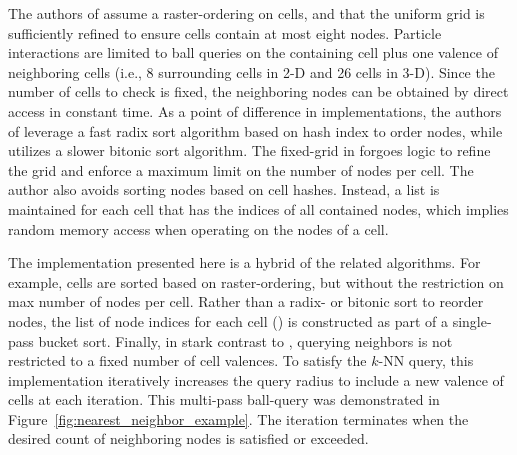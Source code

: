 \documentclass{report}
\begin{document}
The authors of \cite{Krog2010,Johnson2011,Green2010} assume a raster-ordering on cells, and that the uniform grid is sufficiently refined to ensure cells contain at most eight nodes. Particle interactions are limited to ball queries on the containing cell plus one valence of neighboring cells (i.e., 8 surrounding cells in 2-D and 26 cells in 3-D). Since the number of cells to check is fixed, the neighboring nodes can be obtained by direct access in constant time. %
 As a point of difference in implementations, the authors of \cite{Green2010, Krog2010} leverage a fast radix sort algorithm based on hash index to order nodes, while \cite{Johnson2011} utilizes a slower bitonic sort algorithm. The fixed-grid in \cite{Wendland2002,WendlandBook} forgoes logic to refine the grid and enforce a maximum limit on the number of nodes per cell. The author also avoids sorting nodes based on cell hashes. Instead, a list is maintained for each cell that has the indices of all contained nodes, which implies random memory access when operating on the nodes of a cell.    


The implementation presented here is a hybrid of the related algorithms. For example, cells are sorted based on raster-ordering, but without the restriction on max number of nodes per cell. Rather than a radix- or bitonic sort to reorder nodes, the list of node indices for each cell (\cite{Wendland2002,WendlandBook}) is constructed as part of a single-pass bucket sort. Finally, in stark contrast to  \cite{Krog2010,Green2010,Johnson2011,Wendland2002,WendlandBook}, querying neighbors is not restricted to a fixed number of cell valences. To satisfy the $k$-NN query, this implementation iteratively increases the query radius to include a new valence of cells at each iteration. This multi-pass ball-query was demonstrated in Figure~\ref{fig:nearest_neighbor_example}. The iteration terminates when the desired count of neighboring nodes is satisfied or exceeded.
\end{document}
